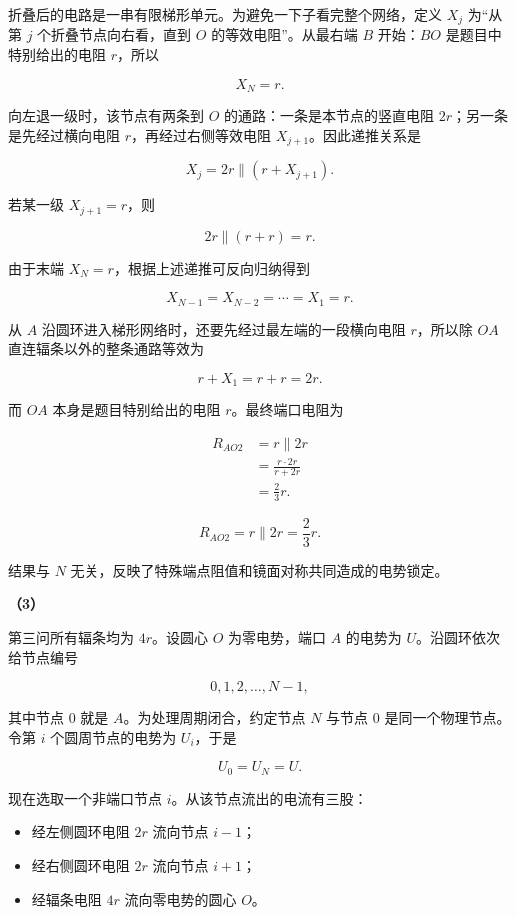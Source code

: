 \documentclass[12pt,a4paper,UTF8]{ctexart}
\newcommand{\tightlist}{\setlength{\itemsep}{0pt}\setlength{\parskip}{0pt}}
\begin{document}
折叠后的电路是一串有限梯形单元。为避免一下子看完整个网络，定义 \(X_j\)
为``从第 \(j\) 个折叠节点向右看，直到 \(O\) 的等效电阻''。从最右端 \(B\)
开始：\(BO\) 是题目中特别给出的电阻 \(r\)，所以

\[X_N=r.\]

向左退一级时，该节点有两条到 \(O\) 的通路：一条是本节点的竖直电阻
\(2r\)；另一条是先经过横向电阻 \(r\)，再经过右侧等效电阻
\(X_{j+1}\)。因此递推关系是

\[X_j=2r\parallel(r+X_{j+1}). \tag{1}\]

若某一级 \(X_{j+1}=r\)，则

\[2r\parallel(r+r)=r.\]

由于末端 \(X_N=r\)，根据上述递推可反向归纳得到

\[X_{N-1}=X_{N-2}=\cdots=X_1=r.\]

从 \(A\) 沿圆环进入梯形网络时，还要先经过最左端的一段横向电阻
\(r\)，所以除 \(OA\) 直连辐条以外的整条通路等效为

\[r+X_1=r+r=2r.\]

而 \(OA\) 本身是题目特别给出的电阻 \(r\)。最终端口电阻为

\[\begin{aligned}
R_{AO2}
&=r\parallel2r\\
&=\frac{r\cdot2r}{r+2r}\\
&=\frac23r.
\end{aligned}\]

\[\boxed{R_{AO2}=r\parallel2r=\frac23r}.\]

结果与 \(N\) 无关，反映了特殊端点阻值和镜面对称共同造成的电势锁定。

\textbf{（3）}

第三问所有辐条均为 \(4r\)。设圆心 \(O\) 为零电势，端口 \(A\) 的电势为
\(U\)。沿圆环依次给节点编号

\[0,1,2,\ldots,N-1,\]

其中节点 \(0\) 就是 \(A\)。为处理周期闭合，约定节点 \(N\) 与节点 \(0\)
是同一个物理节点。令第 \(i\) 个圆周节点的电势为 \(U_i\)，于是

\[U_0=U_N=U.\]

现在选取一个非端口节点 \(i\)。从该节点流出的电流有三股：

\begin{itemize}
\tightlist
\item
  经左侧圆环电阻 \(2r\) 流向节点 \(i-1\)；
\item
  经右侧圆环电阻 \(2r\) 流向节点 \(i+1\)；
\item
  经辐条电阻 \(4r\) 流向零电势的圆心 \(O\)。
\end{itemize}
\end{document}
